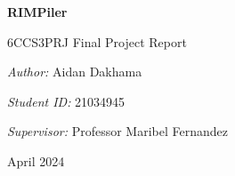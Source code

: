 \begin{titlepage}
    \begin{center}
        \vspace*{1cm}

        \textbf{RIMPiler}

        \vspace{0.5cm}
        6CCS3PRJ Final Project Report

        \vspace{8cm}

        \begin{minipage}{0.8\textwidth}
            \begin{center}
                \large \emph{Author:}
                Aidan Dakhama
            \end{center}
        \end{minipage}

        \vspace{0.5cm}

        \begin{minipage}{0.8\textwidth}
            \begin{center}
                \large \emph{Student ID:}
                21034945
            \end{center}
        \end{minipage}

        \vspace{0.5cm}

        \begin{minipage}{0.8\textwidth}
            \begin{center}
                \large \emph{Supervisor:}
                Professor Maribel Fernandez
            \end{center}
        \end{minipage}

        \vspace{2cm}

        \begin{minipage}{0.8\textwidth}
            \begin{center}
                April 2024
            \end{center}
        \end{minipage}

    \end{center}
\end{titlepage}